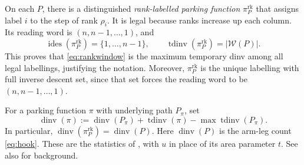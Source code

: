 \documentclass[12pt,reqno]{amsart}
\numberwithin{equation}{section}
\theoremstyle{definition}
\theoremstyle{remark}
\theoremstyle{plain}
\DeclareMathOperator{\dinv}{dinv}
\DeclareMathOperator{\tdinv}{tdinv}
\DeclareMathOperator{\ides}{ides}
\begin{document}
On each $P$, there is a distinguished \emph{rank-labelled parking function} $\pi_P^{\mathrm{rk}}$ that assigns
label $i$ to the step of rank $\rho_i$.  It is legal because ranks
increase up each column.  Its reading word is $(n,n-1,\ldots,1)$, and
\begin{equation}\label{eq:ranklabelled}
 \ides(\pi_P^{\mathrm{rk}})=\{1,\ldots,n-1\},\qquad
 \tdinv(\pi_P^{\mathrm{rk}})=|\mathcal W(P)|.
\end{equation}
This proves that \eqref{eq:rankwindow} is the maximum temporary dinv
among all legal labellings, justifying the notation.  Moreover,
$\pi_P^{\mathrm{rk}}$ is the unique labelling with full inverse descent set,
since that set forces the reading word to be $(n,n-1,\ldots,1)$.

For a parking function $\pi$ with underlying path $P_\pi$, set
\begin{equation}\label{eq:PFdinv}
 \dinv(\pi):=\dinv(P_\pi)+\tdinv(\pi)-\max\tdinv(P_\pi).
\end{equation}
In particular, $\dinv(\pi_P^{\mathrm{rk}})=\dinv(P)$.
Here $\dinv(P)$ is the arm-leg count \eqref{eq:hook}.
These are the statistics of \cite[Algorithm~6.1]{BGLX}, with $u$ in place
of its area parameter $t$.  See also \cite{Haglund} for background.
\end{document}

